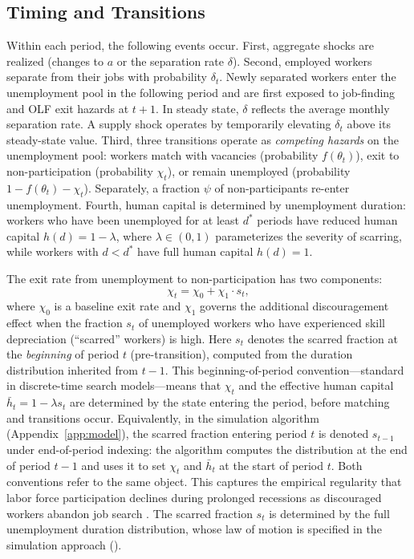 \documentclass[12pt]{article}
\begin{document}
\subsection{Timing and Transitions}

Within each period, the following events occur. First, aggregate shocks are realized (changes to $a$ or the separation rate $\delta$). Second, employed workers separate from their jobs with probability $\delta_t$. Newly separated workers enter the unemployment pool in the following period and are first exposed to job-finding and OLF exit hazards at $t+1$. In steady state, $\delta$ reflects the average monthly separation rate. A supply shock operates by temporarily elevating $\delta_t$ above its steady-state value. Third, three transitions operate as \textit{competing hazards} on the unemployment pool: workers match with vacancies (probability $f(\theta_t)$), exit to non-participation (probability $\chi_t$), or remain unemployed (probability $1 - f(\theta_t) - \chi_t$). Separately, a fraction $\psi$ of non-participants re-enter unemployment. Fourth, human capital is determined by unemployment duration: workers who have been unemployed for at least $d^*$ periods have reduced human capital $h(d) = 1 - \lambda$, where $\lambda \in (0,1)$ parameterizes the severity of scarring, while workers with $d < d^*$ have full human capital $h(d) = 1$.

The exit rate from unemployment to non-participation has two components:
\begin{equation}
\chi_t = \chi_0 + \chi_1 \cdot s_t,
\label{eq:exit_rate}
\end{equation}
where $\chi_0$ is a baseline exit rate and $\chi_1$ governs the additional discouragement effect when the fraction $s_t$ of unemployed workers who have experienced skill depreciation (``scarred'' workers) is high. Here $s_t$ denotes the scarred fraction at the \textit{beginning} of period $t$ (pre-transition), computed from the duration distribution inherited from $t-1$. This beginning-of-period convention---standard in discrete-time search models---means that $\chi_t$ and the effective human capital $\bar{h}_t = 1 - \lambda s_t$ are determined by the state entering the period, before matching and transitions occur. Equivalently, in the simulation algorithm (Appendix~\ref{app:model}), the scarred fraction entering period $t$ is denoted $s_{t-1}$ under end-of-period indexing: the algorithm computes the distribution at the end of period $t-1$ and uses it to set $\chi_t$ and $\bar{h}_t$ at the start of period $t$. Both conventions refer to the same object. This captures the empirical regularity that labor force participation declines during prolonged recessions as discouraged workers abandon job search \citep{elsby2010labor, kroft2016long}. The scarred fraction $s_t$ is determined by the full unemployment duration distribution, whose law of motion is specified in the simulation approach ().
\end{document}
